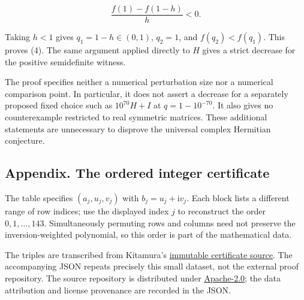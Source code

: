 \documentclass[10pt,a4paper]{article}
\begin{document}
\nopagebreak[4]
\[
\frac{f(1)-f(1-h)}h<0.
\]

Taking \(h<1\) gives \(q_1=1-h\in(0,1)\), \(q_2=1\), and
\(f(q_2)<f(q_1)\). This proves (4). The same argument applied directly
to \(H\) gives a strict decrease for the positive semidefinite witness.

The proof specifies neither a numerical perturbation size nor a
numerical comparison point. In particular, it does not assert a decrease
for a separately proposed fixed choice such as \(10^{70}H+I\) at
\(q=1-10^{-70}\). It also gives no counterexample restricted to real
symmetric matrices. These additional statements are unnecessary to
disprove the universal complex Hermitian conjecture.

\newpage
\subsection{Appendix. The ordered integer
certificate}\label{appendix.-the-ordered-integer-certificate}

The table specifies \((a_j,u_j,v_j)\) with \(b_j=u_j+\mathrm{i}v_j\).
Each block lists a different range of row indices; use the displayed
index \(j\) to reconstruct the order \(0,1,\ldots,143\). Simultaneously
permuting rows and columns need not preserve the inversion-weighted
polynomial, so this order is part of the mathematical data.

The triples are transcribed from Kitamura's
\href{https://github.com/KitaKen1/bapat-lal-q-permanent-lean/blob/4200da4fc1a132d69c23fb877795b5b72089544b/lean/Bapat/Certificate.lean}{immutable
certificate source}. The accompanying JSON repeats precisely this small
dataset, not the external proof repository. The source repository is
distributed under
\href{https://github.com/KitaKen1/bapat-lal-q-permanent-lean/blob/4200da4fc1a132d69c23fb877795b5b72089544b/LICENSE}{Apache-2.0};
the data attribution and license provenance are recorded in the JSON.
\end{document}
